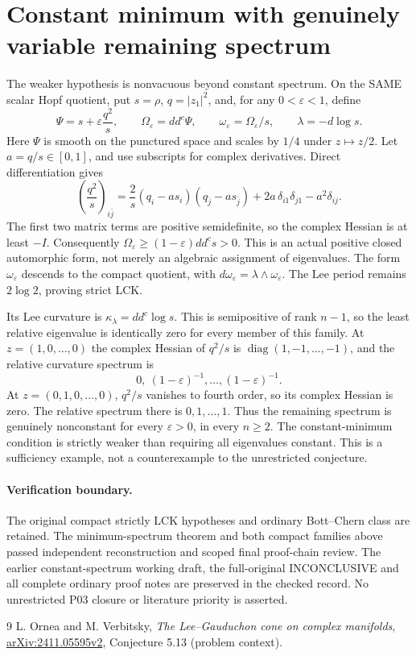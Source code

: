\documentclass[11pt]{article}
\newcommand{\ddc}{dd^c}
\newcommand{\kap}{\kappa_\lambda}
\theoremstyle{remark}\newtheorem{remark}[theorem]{Remark}
\begin{document}
\section{Constant minimum with genuinely variable remaining spectrum}
The weaker hypothesis is nonvacuous beyond constant spectrum.
On the SAME scalar Hopf quotient, put $s=\rho$, $q=|z_1|^2$,
and, for any $0<\varepsilon<1$, define
\[
 \Psi=s+\varepsilon\frac{q^2}{s},\qquad
 \Omega_\varepsilon=\ddc\Psi,\qquad
 \omega_\varepsilon=\Omega_\varepsilon/s,\qquad
 \lambda=-d\log s.
\]
Here $\Psi$ is smooth on the punctured space and scales by $1/4$
under $z\mapsto z/2$. Let $a=q/s\in[0,1]$, and use subscripts
for complex derivatives. Direct differentiation gives
\[
 \left(\frac{q^2}{s}\right)_{i\bar j}
 =\frac{2}{s}(q_i-a s_i)(q_{\bar j}-a s_{\bar j})
       +2a\,\delta_{i1}\delta_{j1}-a^2\delta_{ij}.
\]
The first two matrix terms are positive semidefinite, so the
complex Hessian is at least $-I$. Consequently
$\Omega_\varepsilon\geq(1-\varepsilon)\ddc s>0$.
This is an actual positive closed automorphic form, not merely
an algebraic assignment of eigenvalues. The form
$\omega_\varepsilon$ descends to the compact quotient, with
$d\omega_\varepsilon=\lambda\wedge\omega_\varepsilon$.
The Lee period remains $2\log2$, proving strict LCK.

Its Lee curvature is $\kap=\ddc\log s$. This is semipositive
of rank $n-1$, so the least relative eigenvalue is identically
zero for every member of this family. At $z=(1,0,\ldots,0)$
the complex Hessian of $q^2/s$ is
$\operatorname{diag}(1,-1,\ldots,-1)$, and the relative
curvature spectrum is
\[
 0,\ (1-\varepsilon)^{-1},\ldots,(1-\varepsilon)^{-1}.
\]
At $z=(0,1,0,\ldots,0)$, $q^2/s$ vanishes to fourth order,
so its complex Hessian is zero. The relative spectrum there
is $0,1,\ldots,1$. Thus the remaining spectrum is genuinely
nonconstant for every $\varepsilon>0$, in every $n\geq2$.
The constant-minimum condition is strictly weaker than requiring
all eigenvalues constant. This is a sufficiency example, not a
counterexample to the unrestricted conjecture.

\paragraph{Verification boundary.}
The original compact strictly LCK hypotheses and ordinary
Bott--Chern class are retained. The minimum-spectrum theorem
and both compact families above passed independent reconstruction
and scoped final proof-chain review. The earlier constant-spectrum
working draft, the full-original INCONCLUSIVE and all complete
ordinary proof notes are preserved in the checked record. No unrestricted
P03 closure or literature priority is asserted.

\begin{thebibliography}{9}
 L. Ornea and M. Verbitsky,
\emph{The Lee--Gauduchon cone on complex manifolds},
\href{https://arxiv.org/abs/2411.05595v2}{arXiv:2411.05595v2},
Conjecture 5.13 (problem context).
\end{thebibliography}
\end{document}
